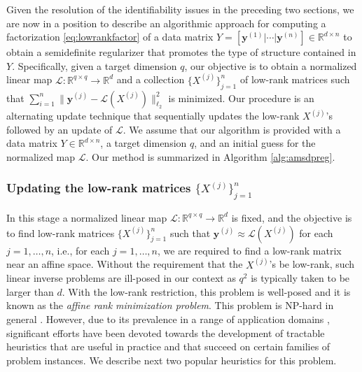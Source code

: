 \documentclass[11pt,letterpaper]{article}
\newcommand{\R}{\mathbb{R}}
\newcommand{\by}{\mathbf{y}}
\renewcommand{\L}{\mathcal{L}}
\begin{document}
Given the resolution of the identifiability issues in the preceding two sections, we are now in a position to describe an algorithmic approach for computing a factorization \eqref{eq:lowrankfactor} of a data matrix $Y = [\by^{(1)} | \cdots | \by^{(n)}] \in \R^{d \times n}$ to obtain a semidefinite regularizer that promotes the type of structure contained in $Y$.  Specifically, given a target dimension $q$, our objective is to obtain a normalized linear map $\L : \R^{q \times q} \rightarrow \R^d$ and a collection $\{X^{(j)}\}_{j=1}^n$ of low-rank matrices such that $\sum_{i=1}^n \|\by^{(j)} - \L(X^{(j)})\|_{\ell_2}^2$ is minimized.  Our procedure is an alternating update technique that sequentially updates the low-rank $X^{(j)}$'s followed by an update of $\L$.  We assume that our algorithm is provided with a data matrix $Y \in \R^{d \times n}$, a target dimension $q$, and an initial guess for the normalized map $\L$.  Our method is summarized in Algorithm \ref{alg:amsdpreg}.

\subsubsection{Updating the low-rank matrices $\{X^{(j)}\}_{j=1}^n$} \label{sec:algorithm_am_lrmrecovery}


In this stage a normalized linear map $\L : \R^{q \times q} \rightarrow \R^d$ is fixed, and the objective is to find low-rank matrices $\{X^{(j)}\}_{j=1}^n$ such that $\by^{(j)} \approx \L(X^{(j)})$ for each $j=1,\dots,n$, i.e., for each $j = 1,\dots,n$, we are required to find a low-rank matrix near an affine space. Without the requirement that the $X^{(j)}$'s be low-rank, such linear inverse problems are ill-posed in our context as $q^2$ is typically taken to be larger than $d$.  With the low-rank restriction, this problem is well-posed and it is known as the \emph{affine rank minimization problem}.  This problem is NP-hard in general \cite{Nat:93}.  However, due to its prevalence in a range of application domains \cite{Faz:02,RFP:10}, significant efforts have been devoted towards the development of tractable heuristics that are useful in practice and that succeed on certain families of problem instances.  We describe next two popular heuristics for this problem.
\end{document}
